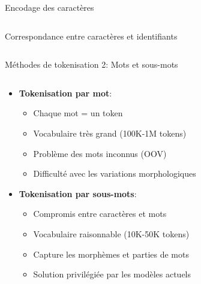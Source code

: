 \documentclass[aspectratio=169,11pt]{beamer}
\begin{document}
\begin{frame}{Encodage des caractères}
\begin{columns}
\begin{column}{0.45\textwidth}
            \vspace{0.1cm}
            \begin{center}
                \small{Correspondance entre caractères et identifiants}
            \end{center}
        \end{column}
    \end{columns}
\end{frame}

\begin{frame}{Méthodes de tokenisation 2: Mots et sous-mots}
    \begin{columns}
        \begin{column}{0.5\textwidth}
            \begin{itemize}
                \item \textbf{Tokenisation par mot}:
                \begin{itemize}
                    \item Chaque mot = un token
                    \item Vocabulaire très grand (100K-1M tokens)
                    \item Problème des mots inconnus (OOV)
                    \item Difficulté avec les variations morphologiques
                \end{itemize}
                \vspace{0.3cm}
                \item \textbf{Tokenisation par sous-mots}:
                \begin{itemize}
                    \item Compromis entre caractères et mots
                    \item Vocabulaire raisonnable (10K-50K tokens)
                    \item Capture les morphèmes et parties de mots
                    \item Solution privilégiée par les modèles actuels
                \end{itemize}
            \end{itemize}
        \end{column}
        \begin{column}{0.5\textwidth}

\end{column}
\end{columns}
\end{frame}
\end{document}
